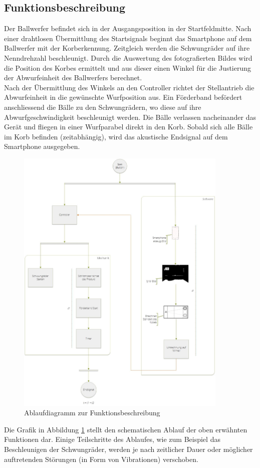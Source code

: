 \subsection{Funktionsbeschreibung}
Der Ballwerfer befindet sich in der Ausgangsposition in der Startfeldmitte. 
Nach einer drahtlosen Übermittlung des Startsignals beginnt das Smartphone auf 
dem Ballwerfer mit der Korberkennung. Zeitgleich werden die Schwungräder auf ihre Nenndrehzahl beschleunigt.
Durch die Auswertung des fotografierten Bildes wird die Position des Korbes ermittelt und aus dieser einen 
Winkel für die Justierung der Abwurfeinheit des Ballwerfers berechnet.\\
Nach der Übermittlung des Winkels an den Controller richtet der Stellantrieb die Abwurfeinheit in die gewünschte Wurfposition aus. 
Ein Förderband befördert anschliessend die Bälle zu den Schwungrädern, wo diese auf ihre Abwurfgeschwindigkeit beschleunigt werden. 
Die Bälle verlassen nacheinander das Gerät und fliegen in einer Wurfparabel direkt in den Korb. Sobald sich alle Bälle im Korb befinden (zeitabhängig),
wird das akustische Endsignal auf dem Smartphone ausgegeben.\\
\newpage

\begin{figure}[h!]
	\centering
	\includegraphics[width=0.9\textwidth]{Enddokumentation/Loesungskonzept/Bilder/FlowOnChart_v2.jpg}
	\caption{Ablaufdiagramm zur Funktionsbeschreibung}
	\label{fig:FlowChart}
\end{figure}
Die Grafik in Abbildung \ref{fig:FlowChart} stellt den schematischen Ablauf der oben erwähnten Funktionen dar. 
Einige Teilschritte des Ablaufes, wie zum Beispiel das Beschleunigen der Schwungräder, werden 
je nach zeitlicher Dauer oder möglicher auftretenden Störungen (in Form von Vibrationen) verschoben.